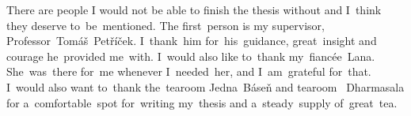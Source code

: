 \Large
There are people I would not be able to finish the thesis without and I~think they deserve to~be~mentioned.
The first~person is my supervisor, Professor~Tomáš~Petříček.
I~thank~him for~his~guidance, great~insight and courage he~provided me~with.
I~would also like to~thank my~fiancée~Lana.
She~was~there for~me whenever I~needed~her, and I~am~grateful for~that.
I~would also want to~thank the~tearoom Jedna~Báseň and tearoom~
Dharmasala for a~comfortable~spot for~writing my~thesis and a~steady~supply of~great~tea.
